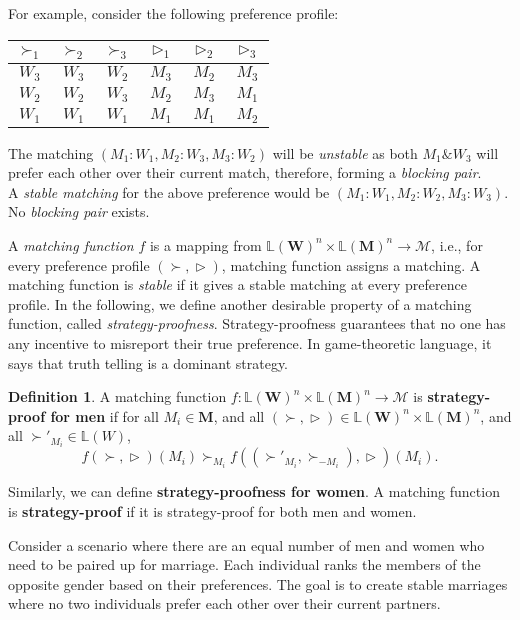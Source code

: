 \documentclass[a4paper,11pt,table]{article}
\newcommand{\rva}{\vartriangleright}
\theoremstyle{definition}
\newtheorem{definition}{Definition}[section]
\theoremstyle{remark}
\begin{document}
For example, consider the following preference profile: \label{preference}
\begin{center}
    \begin{tabular}{c|c|c||c|c|c}
        $\succ_1$ & $\succ_2$ & $\succ_3$ & $\rva_1$ & $\rva_2$ & $\rva_3$\\
        \hline
      $W_3$ & $W_3$ & $W_2$ & $M_3$ & $M_2$ & $M_3$  \\
      $W_2$ & $W_2$ & $W_3$ & $M_2$ & $M_3$ & $M_1$ \\
      $W_1$ & $W_1$ & $W_1$ & $M_1$ & $M_1$ & $M_2$ \\
    \end{tabular}
\end{center}
The matching $(M_1:W_1, M_2:W_3, M_3:W_2)$ will be \textit{unstable} as both $M_1 \& W_3$ will prefer each other over their current match, therefore, forming a \textit{blocking pair}.\\
A \textit{stable matching} for the above preference would be $(M_1:W_1, M_2:W_2, M_3:W_3)$. No \textit{blocking pair} exists.


A \textit{matching function} $f$ is a mapping from $\mathbb{L}(\pmb{W})^n \times \mathbb{L}(\pmb{M})^n \to \mathcal{M}$, i.e., for every preference profile $(\succ,\rva)$, matching function assigns a matching.
A matching function is \textit{stable} if it gives a stable matching at every preference profile. In the following, we define another desirable property of a matching function, called \textit{strategy-proofness}. Strategy-proofness guarantees that no one has any incentive to misreport their true preference. In game-theoretic language, it says that truth telling is a dominant strategy. 

\begin{definition}
    A matching function $f:\mathbb{L}(\pmb{W})^n \times \mathbb{L}(\pmb{M})^n \to \mathcal{M}$ is \textbf{strategy-proof for men} if for all $M_i\in \pmb{M}$, and all $(\succ,\rva)\in \mathbb{L}(\pmb{W})^n \times \mathbb{L}(\pmb{M})^n$, and all $\succ'_{M_i}\in \mathbb{L}(W)$, $$f(\succ, \rva)(M_i)\succ_{M_i}f((\succ'_{M_i},\succ_{-M_i}), \rva)(M_i).$$

    Similarly, we can define \textbf{strategy-proofness for women}. A matching function is \textbf{strategy-proof} if it is strategy-proof for both men and women.
\end{definition}
Consider a scenario where there are an equal number of men and women who need to be paired up for marriage. Each individual ranks the members of the opposite gender based on their preferences. The goal is to create stable marriages where no two individuals prefer each other over their current partners.
\end{document}
